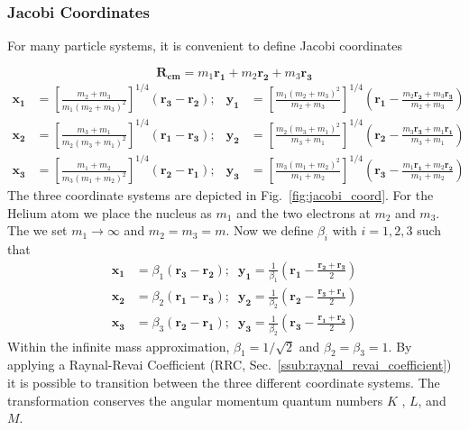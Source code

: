 \subsubsection{Jacobi Coordinates} %
\label{ssub:jacobi_coordinates}
For many particle systems, it is convenient to define Jacobi coordinates

\begin{equation}
\mathbf{R_{cm}} = m_1 \mathbf{r_1} + m_2 \mathbf{r_2} + m_3 \mathbf{r_3}
\end{equation}
\begin{align}
\label{eq:jacobi_coords}
\mathbf{x_1} &= \left[\frac{m_2+m_3}{m_1(m_2+m_3)^2}\right]^{1/4} (\mathbf{r_3}-\mathbf{r_2}); &\mathbf{y_1} &= \left[\frac{m_1(m_2+m_3)^2}{m_2+m_3}\right]^{1/4} \left(\mathbf{r_1}- \frac{m_2\mathbf{r_2}+m_3\mathbf{r_3}}{m_2+m_3} \right)\\
\mathbf{x_2} &= \left[\frac{m_3+m_1}{m_2(m_3+m_1)^2}\right]^{1/4} (\mathbf{r_1}-\mathbf{r_3}); &\mathbf{y_2} &= \left[\frac{m_2(m_3+m_1)^2}{m_3+m_1}\right]^{1/4} \left(\mathbf{r_2}- \frac{m_3\mathbf{r_3}+m_1\mathbf{r_1}}{m_3+m_1} \right)\\
\mathbf{x_3} &= \left[\frac{m_1+m_2}{m_3(m_1+m_2)^2}\right]^{1/4} (\mathbf{r_2}-\mathbf{r_1}); &\mathbf{y_3} &= \left[\frac{m_3(m_1+m_2)^2}{m_1+m_2}\right]^{1/4} \left(\mathbf{r_3}- \frac{m_1\mathbf{r_1}+m_2\mathbf{r_2}}{m_1+m_2} \right)
\end{align}
The three coordinate systems are depicted in Fig.~\ref{fig:jacobi_coord}. For the Helium atom we place the nucleus as $m_1$ and the two electrons at $m_2$ and $m_3$. The we set $m_1\rightarrow \infty$ and $m_2=m_3=m$. Now we define $\beta_i$ with $i=1,2,3$ such that
\begin{align}
\mathbf{x_1} &= \beta_1 (\mathbf{r_3}-\mathbf{r_2}); \; \; \mathbf{y_1} = \frac{1}{\beta_1} \left(\mathbf{r_1}- \frac{\mathbf{r_2}+\mathbf{r_3}}{2} \right)\\
\mathbf{x_2} &= \beta_2 (\mathbf{r_1}-\mathbf{r_3}); \; \; \mathbf{y_2} = \frac{1}{\beta_2} \left(\mathbf{r_2}- \frac{\mathbf{r_3}+\mathbf{r_1}}{2} \right)\\
\mathbf{x_3} &= \beta_3 (\mathbf{r_2}-\mathbf{r_1}); \; \; \mathbf{y_3} = \frac{1}{\beta_2} \left(\mathbf{r_3}- \frac{\mathbf{r_1}+\mathbf{r_2}}{2} \right)
\end{align}
Within the infinite mass approximation, $\beta_1=1/\sqrt{2}$ and $\beta_2=\beta_3=1$. By applying a Raynal-Revai Coefficient (RRC, Sec.~\ref{ssub:raynal_revai_coefficient}) it is possible to transition between the three different coordinate systems.  The transformation conserves the angular momentum quantum numbers $K$ , $L$, and $M$.

